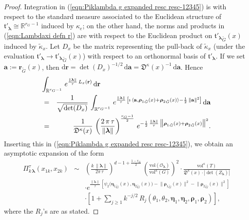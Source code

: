 \documentclass[12pt,a4paper]{article}
\theoremstyle{plain}
\theoremstyle{definition}
\begin{document}
\begin{proof}
%
Integration in (\ref{eqn:Piklambda g expanded resc resc-12345}) is with respect to the standard measure associated to the Euclidean structure of
$\mathfrak{t}'_{\boldsymbol{\lambda}}\cong \mathbb{R}^{r_G-1}$ induced
by $\kappa_e$; on the other hand, the norms and products in 
(\ref{eqn:Lambdaxi defn r}) are with respect 
to the Euclidean product 
on ${\mathfrak{t}'_{\boldsymbol{\lambda}}}_{\tilde{G}}(x)$ induced by
$\tilde{\kappa}_x$. 
Let
$D_x$ be the matrix representing the pull-back of $\tilde{\kappa}_x$
(under the evaluation $\mathfrak{t}'_{\boldsymbol{\lambda}}
\rightarrow {\mathfrak{t}'_{\boldsymbol{\lambda}}}_{\tilde{G}}(x)$)
with respect to an orthonormal basis of 
$\mathfrak{t}'_{\boldsymbol{\lambda}}$.
If we set 
$\mathbf{a}:=\mathbf{r}_{\tilde{G}}(x)$, then 
$
\mathrm{d}\mathbf{r}=\det(D_x)^{-1/2}\,
\mathrm{d}\mathbf{a}=\mathfrak{D}^\kappa (x)^{-1}\,\mathrm{d}\mathbf{a}$.
Hence
\begin{eqnarray}
\lefteqn{
\int_{\mathbb{R}^{r_G-1}}\,
e^{\frac{\|\boldsymbol{\lambda}\|}{\tau}\,L_x (\mathbf{r})}\,\mathrm{d}\mathbf{r} }  \\
&=&\frac{1}{\sqrt{\det(D_x)}}\,
\int_{\mathbb{R}^{r_G-1}}\,
e^{\frac{\|\boldsymbol{\lambda}\|}{\tau}\,
\left[ \imath\,\langle\mathbf{a}, {\boldsymbol{\rho}_1}_{\tilde{G}}(x)
+{\boldsymbol{\rho}_2}_{\tilde{G}}(x)\rangle
-\frac{1}{2}\,\|\mathbf{a}\|^2\right]
}\,\mathrm{d}\mathbf{a}  \nonumber\\
&=&\frac{1}{\mathfrak{D}^\kappa (x)}\,
\left(\frac{2\,\pi\,\tau}{\| \boldsymbol{\lambda} \|} \right)^{\frac{r_G-1}{2}}
\,e^{-\frac{1}{2}\,\frac{\|\boldsymbol{\lambda}\|}{\tau}\,
\big\|
{\boldsymbol{\rho}_1}_{\tilde{G}}(x)+{\boldsymbol{\rho}_2}_{\tilde{G}}(x)\big\|^2
}.\nonumber
\end{eqnarray}
Inserting this in (\ref{eqn:Piklambda g expanded resc resc-12345}),
we obtain an asymptotic expansion of the form
\begin{eqnarray}
\label{eqn:Piklambda g expanded resc resc-012345int}
\Pi^\tau_{k\,\boldsymbol{\lambda}}(x_{1k},x_{2k})
&\sim&
\left( \frac{k\,\| \boldsymbol{\lambda} \|}{2\pi\,\tau}  \right)
^{d-1+\frac{1-r_G}{2}}\,
\left(\frac{\mathrm{vol}(\mathcal{O}_{\boldsymbol{\lambda}})}{\mathrm{vol}^\kappa (G)}\right)^2\cdot 
\frac{\mathrm{vol}^\kappa
(T)}{\mathfrak{D}^\kappa (x)\cdot|\det\left(Z_{\boldsymbol{\lambda}}\right)   |}\nonumber
%
\\
&&\cdot e^{\frac{\|\boldsymbol{\lambda}\|}{\tau}\,\left[
\psi_2\big( {\boldsymbol{\eta}_1}_{\tilde{G}}(x)
%
,
{\boldsymbol{\eta}_2}_{\tilde{G}}(x)  \big)
-\big\|
{\boldsymbol{\rho}_1}_{\tilde{G}}(x)\big\|^2
-\big\|{\boldsymbol{\rho}_2}_{\tilde{G}}(x)\big\|^2
\right]}\nonumber\\
&&\cdot \left[1+\sum_{j\ge 1}k^{-j/2}\,R_j(\theta_1,\theta_2,\boldsymbol{\eta}_1,
\boldsymbol{\eta}_2,\boldsymbol{\rho}_1,
\boldsymbol{\rho}_2)    \right],\nonumber
\end{eqnarray}
where the $R_j$'s are as stated.



\end{proof}
\end{document}
